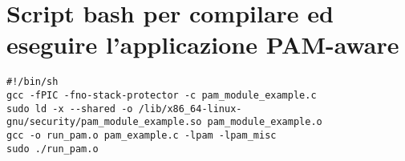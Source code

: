 \section{Script bash per compilare ed eseguire l'applicazione PAM-aware}
\lstset{language=bash}
\begin{lstlisting}
#!/bin/sh
gcc -fPIC -fno-stack-protector -c pam_module_example.c
sudo ld -x --shared -o /lib/x86_64-linux-gnu/security/pam_module_example.so pam_module_example.o
gcc -o run_pam.o pam_example.c -lpam -lpam_misc
sudo ./run_pam.o

\end{lstlisting}